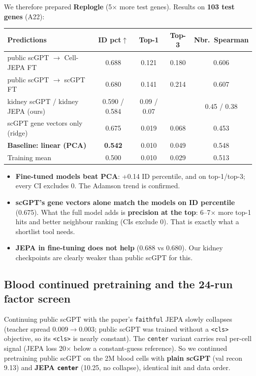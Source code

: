 \documentclass[11pt]{article}
\newcommand{\code}[1]{\texttt{\small #1}}
\newcommand{\up}{$\uparrow$}
\begin{document}
We therefore prepared \textbf{Replogle} (5$\times$ more test genes). Results on \textbf{103 test genes} (A22):
\begin{center}\small
\begin{tabular}{lcccc}
\toprule
Predictions & ID pct\up & Top-1 & Top-3 & Nbr.\ Spearman\\
\midrule
public scGPT $\to$ Cell-JEPA FT & 0.688 & 0.121 & 0.180 & 0.606\\
public scGPT $\to$ scGPT FT & 0.680 & 0.141 & 0.214 & 0.607\\
kidney scGPT / kidney JEPA (ours) & 0.590 / 0.584 & 0.09 / 0.07 & & 0.45 / 0.38\\
scGPT gene vectors only (ridge) & 0.675 & 0.019 & 0.068 & 0.453\\
\textbf{Baseline: linear (PCA)} & \textbf{0.542} & 0.010 & 0.049 & 0.548\\
Training mean & 0.500 & 0.010 & 0.029 & 0.513\\
\bottomrule
\end{tabular}
\end{center}
\begin{itemize}
\item \textbf{Fine-tuned models beat PCA}: +0.14 ID percentile, and on top-1/top-3; every CI excludes 0. The Adamson trend is confirmed.
\item \textbf{scGPT's gene vectors alone match the models on ID percentile} (0.675). What the full model adds is \textbf{precision at the top}: 6--7$\times$ more top-1 hits and better neighbour ranking (CIs exclude 0). That is exactly what a shortlist tool needs.
\item \textbf{JEPA in fine-tuning does not help} (0.688 vs 0.680). Our kidney checkpoints are clearly weaker than public scGPT for this.
\end{itemize}

\subsection{Blood continued pretraining and the 24-run factor screen}
Continuing public scGPT with the paper's \code{faithful} JEPA slowly collapses (teacher spread $0.009\to0.003$; public scGPT was trained without a \code{<cls>} objective, so its \code{<cls>} is nearly constant). The \code{center} variant carries real per-cell signal (JEPA loss 20$\times$ below a constant-guess reference). So we continued pretraining public scGPT on the 2M blood cells with \textbf{plain scGPT} (val recon 9.13) and \textbf{JEPA \code{center}} (10.25, no collapse), identical init and data order.
\end{document}
